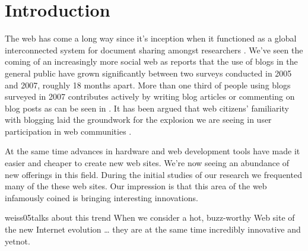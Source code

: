 \chapter{Introduction}

%
%

The web has come a long way since it's inception when it functioned as a
global interconnected system for document sharing amongst researchers
\citep[p.~82]{bernerslee92}. We've
seen the coming of an increasingly more social web as
\citet[ch.~1, p.~2]{rosa07} reports that the
use of blogs in the general public%
have grown significantly between two surveys conducted in 2005 and 2007,
roughly 18 months apart.
More than one third of people using blogs surveyed in 2007 contributes
actively by writing blog articles or commenting on blog posts as can be seen
in 
\citep[ch.~1, p.~6]{rosa07}.
It has been argued that web citizens'
familiarity with blogging laid the groundwork for the explosion we are seeing
in user participation in web communities \citep{weiss05,beer07}.

At the same time advances in hardware and web development tools have made it
easier and cheaper to create new web sites. We're now seeing an
abundance of new offerings in this field.
During the initial studies of our research we frequented
many of the these web sites. Our impression is that
this area of the web infamously coined %
is bringing interesting innovations.
\begin{fullquote}[p.~18]{weiss05}{talks about this trend}
  When we consider a hot, buzz-worthy Web site of the new Internet evolution
  \ldots
  they are at the same time incredibly innovative and yet\dash{}not.
\end{fullquote}

